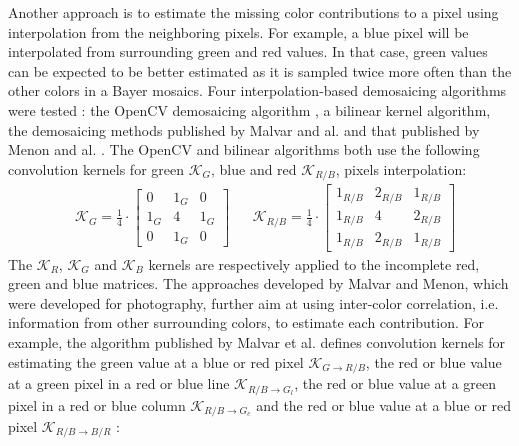 \documentclass[12pt]{iopart}
\begin{document}
Another approach is to estimate the missing color contributions to a pixel using interpolation from the neighboring pixels. For example, a blue pixel will be interpolated from surrounding green and red values. In that case, green values can be expected to be better estimated as it is sampled twice more often than the other colors in a Bayer mosaics. Four interpolation-based demosaicing algorithms were tested : the OpenCV demosaicing algorithm \cite{opencv_library}, a bilinear kernel algorithm, the demosaicing methods published by Malvar and al. \cite{Malvar_2004} and that published by Menon and al. \cite{Menon_2007}. The OpenCV and bilinear algorithms both use the following convolution kernels for green $\mathcal{K}_G$, blue and red $\mathcal{K}_{R/B}$, pixels interpolation:
\begin{align}
    & \mathcal{K}_G = \frac{1}{4} \cdot \begin{bmatrix}
    0 & 1_G & 0 \\
    1_G & 4 & 1_G \\
    0 & 1_G & 0\end{bmatrix}  && \mathcal{K}_{R/B} = \frac{1}{4} \cdot \begin{bmatrix}
    1_{R/B} & 2_{R/B} & 1_{R/B} \\
    1_{R/B} & 4 & 2_{R/B} \\
    1_{R/B} & 2_{R/B} & 1_{R/B} 
    \end{bmatrix}
\end{align}
The  $\mathcal{K}_R$, $\mathcal{K}_G$ and  $\mathcal{K}_B$ kernels are respectively applied to the incomplete red, green and blue matrices. The approaches developed by Malvar and Menon, which were developed for photography, further aim at using inter-color correlation, i.e. information from other surrounding colors, to estimate each contribution. For example, the algorithm published by Malvar et al. defines convolution kernels for estimating the green value at a blue or red pixel $\mathcal{K}_{G\rightarrow R/B}$, the red or blue value at a green pixel in a red or blue line  $\mathcal{K}_{R/B\rightarrow G_l}$, the red or blue value at a green pixel in a red or blue column $\mathcal{K}_{R/B\rightarrow G_c}$ and the red or blue value at a blue or red pixel $\mathcal{K}_{R/B\rightarrow B/R}$ \cite{Malvar_2004}:
\end{document}
